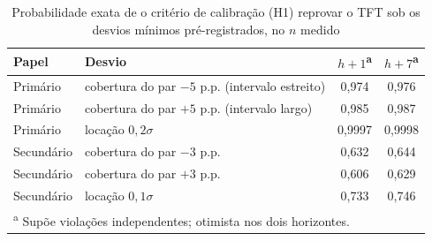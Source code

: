 \begin{table}[htb]
\centering
\caption[Poder do critério de calibração (H1) sob os desvios pré-registrados]{Probabilidade exata de o critério de calibração (H1) reprovar o TFT sob os desvios mínimos pré-registrados, no \(n\) medido}
\label{tab:h1-poder}
\small
\begin{tabular}{l l c c}
\toprule
Papel & Desvio & \(h+1\)\textsuperscript{a} & \(h+7\)\textsuperscript{a} \\
\midrule
Primário & cobertura do par \(-5\) p.p. (intervalo estreito) & 0,974 & 0,976 \\
Primário & cobertura do par \(+5\) p.p. (intervalo largo) & 0,985 & 0,987 \\
Primário & locação \(0{,}2\sigma\) & 0,9997 & 0,9998 \\
Secundário & cobertura do par \(-3\) p.p. & 0,632 & 0,644 \\
Secundário & cobertura do par \(+3\) p.p. & 0,606 & 0,629 \\
Secundário & locação \(0{,}1\sigma\) & 0,733 & 0,746 \\
\bottomrule
\multicolumn{4}{l}{\footnotesize \textsuperscript{a} Supõe violações independentes; otimista nos dois horizontes.}
\end{tabular}
\end{table}

